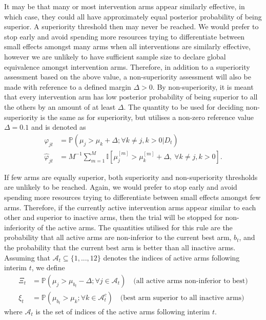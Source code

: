 \documentclass[
  bibliography=totoc]{scrreprt}
\begin{document}
It may be that many or most intervention arms appear similarly effective, in which case, they could all have approximately equal posterior probability of being superior.
A superiority threshold then may never be reached.
We would prefer to stop early and avoid spending more resources trying to differentiate between small effects amongst many arms when all interventions are similarly effective, however we are unlikely to have sufficient sample size to declare global equivalence amongst intervention arms.
Therefore, in addition to a superiority assessment based on the above value, a non-superiority assessment will also be made with reference to a defined margin \(\Delta>0\).
By non-superiority, it is meant that every intervention arm has low posterior probability of being superior to all the others by an amount of at least \(\Delta\).
The quantity to be used for deciding non-superiority is the same as for superiority, but utilises a non-zero reference value \(\Delta=0.1\) and is denoted as
\[
\begin{aligned}
\varphi_{jt} &= \mathbb P(\mu_j > \mu_k+\Delta;\forall k\ne j,k>0|D_t) \\
\hat\varphi_{jt} &= M^{-1}\sum_{m=1}^M \mathbb I\left[\mu_{j}^{[m]}>\mu_k^{[m]} + \Delta,\ \forall k\ne j,k>0\right].
\end{aligned}
\]

If few arms are equally superior, both superiority and non-superiority thresholds are unlikely to be reached.
Again, we would prefer to stop early and avoid spending more resources trying to differentiate between small effects amongst few arms.
Therefore, if the currently active intervention arms appear similar to each other and superior to inactive arms, then the trial will be stopped for non-inferiority of the active arms.
The quantities utilised for this rule are the probability that all active arms are non-inferior to the current best arm, \(b_t\), and the probability that the current best arm is better than all inactive arms.
Assuming that \(\mathcal{A}_t\subseteq\{1,...,12\}\) denotes the indices of active arms following interim \(t\), we define
\[
\begin{aligned}
\Xi_t &= \mathbb P(\mu_j > \mu_{b_t} - \Delta; \forall j \in \mathcal{A}_t)\quad\text{(all active arms non-inferior to best)} \\
\xi_t &= \mathbb P(\mu_{b_t} > \mu_k; \forall k \in \mathcal{A}_t^c)\quad\text{(best arm superior to all inactive arms)}
\end{aligned}
\]
where \(\mathcal{A}_t\) is the set of indices of the active arms following interim \(t\).
\end{document}
